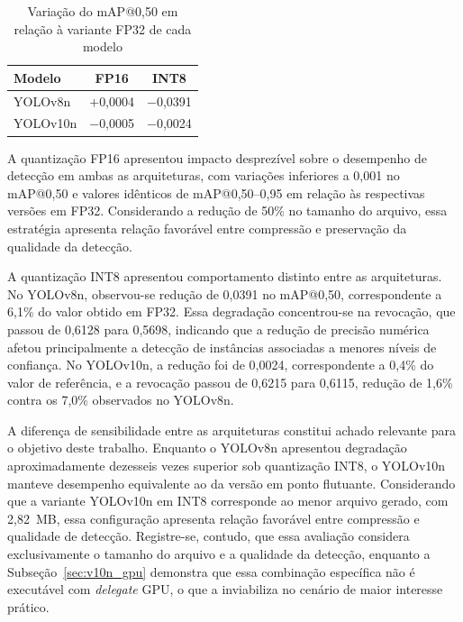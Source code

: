\documentclass[artigo,times,capa]{iftex2024}
\begin{document}
\begin{table}[H]
\centering
\caption{Variação do \ac{mAP}@0,50 em relação à variante \ac{FP32} de cada modelo}
\label{tab:impacto_quantizacao}
\begin{tabular}{lcc}
\toprule
\textbf{Modelo} & \textbf{\ac{FP16}} & \textbf{\ac{INT8}} \\
\midrule
YOLOv8n  & $+$0,0004 & $-$0,0391 \\
YOLOv10n & $-$0,0005 & $-$0,0024 \\
\bottomrule
\end{tabular}
\end{table}

A quantização \ac{FP16} apresentou impacto desprezível sobre o desempenho de detecção em ambas as arquiteturas, com variações inferiores a 0,001 no \ac{mAP}@0,50 e valores idênticos de \ac{mAP}@0,50--0,95 em relação às respectivas versões em \ac{FP32}. Considerando a redução de 50\% no tamanho do arquivo, essa estratégia apresenta relação favorável entre compressão e preservação da qualidade da detecção.

A quantização \ac{INT8} apresentou comportamento distinto entre as arquiteturas. No YOLOv8n, observou-se redução de 0,0391 no \ac{mAP}@0,50, correspondente a 6,1\% do valor obtido em \ac{FP32}. Essa degradação concentrou-se na revocação, que passou de 0,6128 para 0,5698, indicando que a redução de precisão numérica afetou principalmente a detecção de instâncias associadas a menores níveis de confiança. No YOLOv10n, a redução foi de 0,0024, correspondente a 0,4\% do valor de referência, e a revocação passou de 0,6215 para 0,6115, redução de 1,6\% contra os 7,0\% observados no YOLOv8n.

A diferença de sensibilidade entre as arquiteturas constitui achado relevante para o objetivo deste trabalho. Enquanto o YOLOv8n apresentou degradação aproximadamente dezesseis vezes superior sob quantização \ac{INT8}, o YOLOv10n manteve desempenho equivalente ao da versão em ponto flutuante. Considerando que a variante YOLOv10n em \ac{INT8} corresponde ao menor arquivo gerado, com 2,82~MB, essa configuração apresenta relação favorável entre compressão e qualidade de detecção. Registre-se, contudo, que essa avaliação considera exclusivamente o tamanho do arquivo e a qualidade da detecção, enquanto a Subseção~\ref{sec:v10n_gpu} demonstra que essa combinação específica não é executável com \textit{delegate} \ac{GPU}, o que a inviabiliza no cenário de maior interesse prático.
\end{document}
